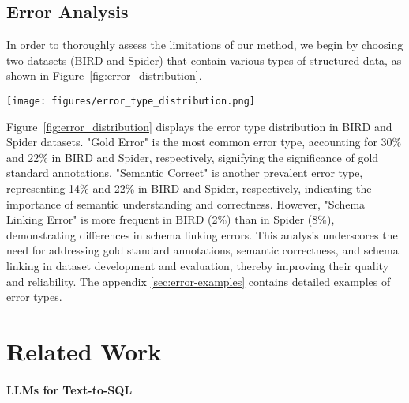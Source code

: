 \subsection{Error Analysis}

In order to thoroughly assess the limitations of our method, we begin by choosing two datasets (BIRD and Spider) that contain various types of structured data, as shown in Figure~\ref{fig:error_distribution}. 

\begin{figure*}[t]
    \centering
    \texttt{[image: figures/error\_type\_distribution.png]}
    \caption{Error Distributions of \ours{} on dev set of BIRD and Spider.}
    \label{fig:error_distribution}
\end{figure*}

Figure~\ref{fig:error_distribution} displays the error type distribution in BIRD and Spider datasets. "Gold Error" is the most common error type, accounting for 30\% and 22\% in BIRD and Spider, respectively, signifying the significance of gold standard annotations. "Semantic Correct" is another prevalent error type, representing 14\% and 22\% in BIRD and Spider, respectively, indicating the importance of semantic understanding and correctness. However, "Schema Linking Error" is more frequent in BIRD (2\%) than in Spider (8\%), demonstrating differences in schema linking errors.
This analysis underscores the need for addressing gold standard annotations, semantic correctness, and schema linking in dataset development and evaluation, thereby improving their quality and reliability. 
The appendix \ref{sec:error-examples} contains detailed examples of error types.

\section{Related Work}

\paragraph{LLMs for Text-to-SQL} 

